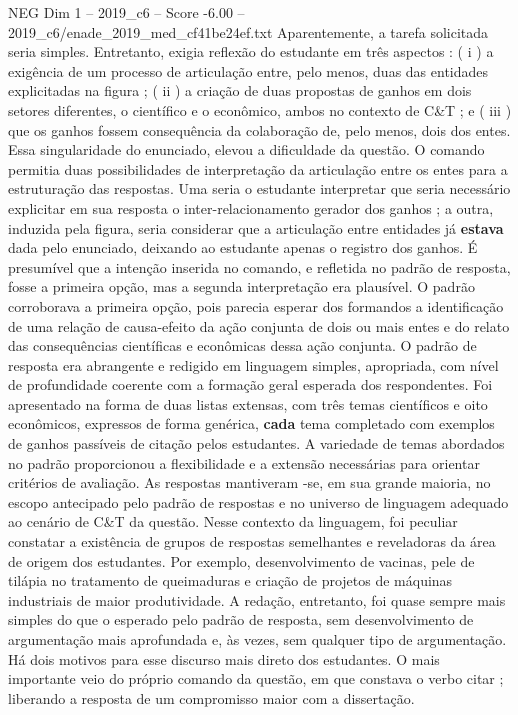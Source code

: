 \begin{textsample}{NEG Dim 1 – 2019\_c6 – Score -6.00 – 2019\_c6/enade\_2019\_med\_cf41be24ef.txt}
Aparentemente, a tarefa solicitada seria simples.
Entretanto, exigia reflexão do estudante em três aspectos : ( i ) a exigência de um processo de articulação entre, pelo menos, duas das entidades explicitadas na figura ; ( ii ) a criação de duas propostas de ganhos em dois setores diferentes, o científico e o econômico, ambos no contexto de C\&T ; e ( iii ) que os ganhos fossem consequência da colaboração de, pelo menos, dois dos entes.
Essa singularidade do enunciado, elevou a dificuldade da questão.
O comando permitia duas possibilidades de interpretação da articulação entre os entes para a estruturação das respostas.
Uma seria o estudante interpretar que seria necessário explicitar em sua resposta o inter-relacionamento gerador dos ganhos ; a outra, induzida pela figura, seria considerar que a articulação entre entidades já \textbf{estava} dada pelo enunciado, deixando ao estudante apenas o registro dos ganhos.
É presumível que a intenção inserida no comando, e refletida no padrão de resposta, fosse a primeira opção, mas a segunda interpretação era plausível.
O padrão corroborava a primeira opção, pois parecia esperar dos formandos a identificação de uma relação de causa-efeito da ação conjunta de dois ou mais entes e do relato das consequências científicas e econômicas dessa ação conjunta.
O padrão de resposta era abrangente e redigido em linguagem simples, apropriada, com nível de profundidade coerente com a formação geral esperada dos respondentes.
Foi apresentado na forma de duas listas extensas, com três temas científicos e oito econômicos, expressos de forma genérica, \textbf{cada} tema completado com exemplos de ganhos passíveis de citação pelos estudantes.
A variedade de temas abordados no padrão proporcionou a flexibilidade e a extensão necessárias para orientar critérios de avaliação.
As respostas mantiveram -se, em sua grande maioria, no escopo antecipado pelo padrão de respostas e no universo de linguagem adequado ao cenário de C\&T da questão.
Nesse contexto da linguagem, foi peculiar constatar a existência de grupos de respostas semelhantes e reveladoras da área de origem dos estudantes.
Por exemplo, desenvolvimento de vacinas, pele de tilápia no tratamento de queimaduras e criação de projetos de máquinas industriais de maior produtividade.
A redação, entretanto, foi quase sempre mais simples do que o esperado pelo padrão de resposta, sem desenvolvimento de argumentação mais aprofundada e, às vezes, sem qualquer tipo de argumentação.
Há dois motivos para esse discurso mais direto dos estudantes.
O mais importante veio do próprio comando da questão, em que constava o verbo citar ; liberando a resposta de um compromisso maior com a dissertação.

\end{textsample}
